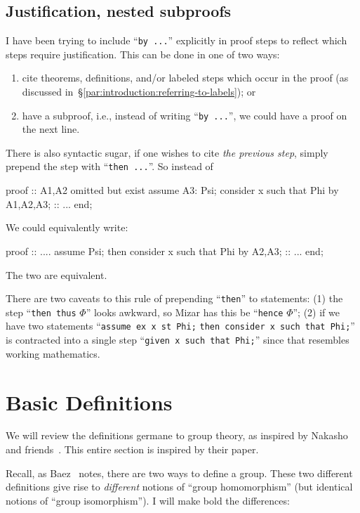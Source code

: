 {\subsection{Justification, nested subproofs}
I have been trying to include ``\verb#by ...#'' explicitly in proof
steps to reflect which steps require justification. This can be done in
one of two ways:
\begin{enumerate}
\item cite theorems, definitions, and/or labeled steps which occur in
  the proof (as discussed in~\S\ref{par:introduction:referring-to-labels}); or
\item have a subproof, i.e., instead of writing ``\verb#by ...#'', we
  could have a proof on the next line.
\end{enumerate}
There is also syntactic sugar, if one wishes to cite \emph{the previous step},
simply prepend the step with ``\verb#then ...#''. So instead of
\begin{mizar}
proof
  :: A1,A2 omitted but exist
  assume A3: Psi;
  consider x such that Phi by A1,A2,A3;
  :: ...
end;
\end{mizar}
We could equivalently write:
\begin{mizar}
proof
  :: ....
  assume Psi;
  then consider x such that Phi by A2,A3;
  :: ...
end;
\end{mizar}
The two are equivalent.

\begin{ddanger}
  There are two caveats to this rule of prepending ``\verb#then#'' to
  statements: (1) the step ``\verb#then thus# $\Phi$'' looks awkward, so
  Mizar has this be ``\verb#hence# $\Phi$'';
  (2) if we have two statements
  ``\verb#assume ex x st Phi;# \verb#then consider x such that Phi;#'' is
  contracted into a single step
  ``\verb#given x such that Phi;#'' since
  that resembles working mathematics.
\end{ddanger}

\section{Basic Definitions}

We will review the definitions germane to group theory, as inspired
by Nakasho and friends~\cite{nakasho2014formalization}. This entire
section is inspired by their paper.

Recall, as Baez~\cite[week one]{baez2004qg-lectures} notes, there are
two ways to define a group. These two different definitions give rise to
\emph{different} notions of ``group homomorphism'' (but identical
notions of ``group isomorphism''). I will make bold the differences:

}
